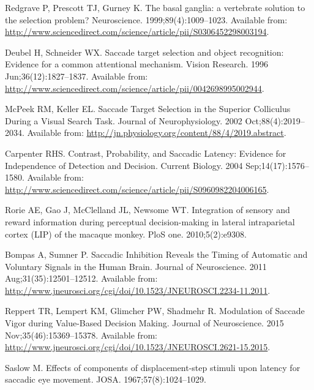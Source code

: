 \documentclass[10pt,letterpaper]{article}
\begin{document}
\begin{thebibliography}{10}
Redgrave P, Prescott TJ, Gurney K.
\newblock The basal ganglia: a vertebrate solution to the selection problem?
\newblock Neuroscience. 1999;89(4):1009--1023.
\newblock Available from:
  \url{http://www.sciencedirect.com/science/article/pii/S0306452298003194}.

Deubel H, Schneider WX.
\newblock Saccade target selection and object recognition: {Evidence} for a
  common attentional mechanism.
\newblock Vision Research. 1996 Jun;36(12):1827--1837.
\newblock Available from:
  \url{http://www.sciencedirect.com/science/article/pii/0042698995002944}.

McPeek RM, Keller EL.
\newblock Saccade {Target} {Selection} in the {Superior} {Colliculus} {During}
  a {Visual} {Search} {Task}.
\newblock Journal of Neurophysiology. 2002 Oct;88(4):2019--2034.
\newblock Available from:
  \url{http://jn.physiology.org/content/88/4/2019.abstract}.

Carpenter RHS.
\newblock Contrast, {Probability}, and {Saccadic} {Latency}: {Evidence} for
  {Independence} of {Detection} and {Decision}.
\newblock Current Biology. 2004 Sep;14(17):1576--1580.
\newblock Available from:
  \url{http://www.sciencedirect.com/science/article/pii/S0960982204006165}.

Rorie AE, Gao J, McClelland JL, Newsome WT.
\newblock Integration of sensory and reward information during perceptual
  decision-making in lateral intraparietal cortex ({LIP}) of the macaque
  monkey.
\newblock PloS one. 2010;5(2):e9308.

Bompas A, Sumner P.
\newblock Saccadic {Inhibition} {Reveals} the {Timing} of {Automatic} and
  {Voluntary} {Signals} in the {Human} {Brain}.
\newblock Journal of Neuroscience. 2011 Aug;31(35):12501--12512.
\newblock Available from:
  \url{http://www.jneurosci.org/cgi/doi/10.1523/JNEUROSCI.2234-11.2011}.

Reppert TR, Lempert KM, Glimcher PW, Shadmehr R.
\newblock Modulation of {Saccade} {Vigor} during {Value}-{Based} {Decision}
  {Making}.
\newblock Journal of Neuroscience. 2015 Nov;35(46):15369--15378.
\newblock Available from:
  \url{http://www.jneurosci.org/cgi/doi/10.1523/JNEUROSCI.2621-15.2015}.

Saslow M.
\newblock Effects of components of displacement-step stimuli upon latency for
  saccadic eye movement.
\newblock JOSA. 1967;57(8):1024--1029.


\end{thebibliography}
\end{document}
